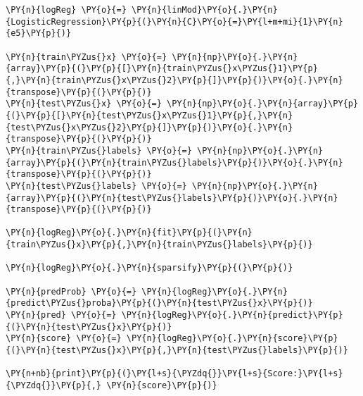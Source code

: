 {\par%
\vspace{-1\baselineskip}%
}%
\begin{notebookcell}[]%
\begin{addmargin}[\cellleftmargin]{0em}%
{\smaller%
\par%
%
\vspace{-1\smallerfontscale}%
\begin{Verbatim}[commandchars=\\\{\}]
\PY{n}{logReg} \PY{o}{=} \PY{n}{linMod}\PY{o}{.}\PY{n}{LogisticRegression}\PY{p}{(}\PY{n}{C}\PY{o}{=}\PY{l+m+mi}{1}\PY{n}{e5}\PY{p}{)}

\PY{n}{train\PYZus{}x} \PY{o}{=} \PY{n}{np}\PY{o}{.}\PY{n}{array}\PY{p}{(}\PY{p}{[}\PY{n}{train\PYZus{}x\PYZus{}1}\PY{p}{,}\PY{n}{train\PYZus{}x\PYZus{}2}\PY{p}{]}\PY{p}{)}\PY{o}{.}\PY{n}{transpose}\PY{p}{(}\PY{p}{)}
\PY{n}{test\PYZus{}x} \PY{o}{=} \PY{n}{np}\PY{o}{.}\PY{n}{array}\PY{p}{(}\PY{p}{[}\PY{n}{test\PYZus{}x\PYZus{}1}\PY{p}{,}\PY{n}{test\PYZus{}x\PYZus{}2}\PY{p}{]}\PY{p}{)}\PY{o}{.}\PY{n}{transpose}\PY{p}{(}\PY{p}{)}
\PY{n}{train\PYZus{}labels} \PY{o}{=} \PY{n}{np}\PY{o}{.}\PY{n}{array}\PY{p}{(}\PY{n}{train\PYZus{}labels}\PY{p}{)}\PY{o}{.}\PY{n}{transpose}\PY{p}{(}\PY{p}{)}
\PY{n}{test\PYZus{}labels} \PY{o}{=} \PY{n}{np}\PY{o}{.}\PY{n}{array}\PY{p}{(}\PY{n}{test\PYZus{}labels}\PY{p}{)}\PY{o}{.}\PY{n}{transpose}\PY{p}{(}\PY{p}{)}

\PY{n}{logReg}\PY{o}{.}\PY{n}{fit}\PY{p}{(}\PY{n}{train\PYZus{}x}\PY{p}{,}\PY{n}{train\PYZus{}labels}\PY{p}{)}

\PY{n}{logReg}\PY{o}{.}\PY{n}{sparsify}\PY{p}{(}\PY{p}{)}

\PY{n}{predProb} \PY{o}{=} \PY{n}{logReg}\PY{o}{.}\PY{n}{predict\PYZus{}proba}\PY{p}{(}\PY{n}{test\PYZus{}x}\PY{p}{)}
\PY{n}{pred} \PY{o}{=} \PY{n}{logReg}\PY{o}{.}\PY{n}{predict}\PY{p}{(}\PY{n}{test\PYZus{}x}\PY{p}{)}
\PY{n}{score} \PY{o}{=} \PY{n}{logReg}\PY{o}{.}\PY{n}{score}\PY{p}{(}\PY{n}{test\PYZus{}x}\PY{p}{,}\PY{n}{test\PYZus{}labels}\PY{p}{)}

\PY{n+nb}{print}\PY{p}{(}\PY{l+s}{\PYZdq{}}\PY{l+s}{Score:}\PY{l+s}{\PYZdq{}}\PY{p}{,} \PY{n}{score}\PY{p}{)}
\end{Verbatim}
%
\par%
\vspace{-1\smallerfontscale}}%
\end{addmargin}
\end{notebookcell}




